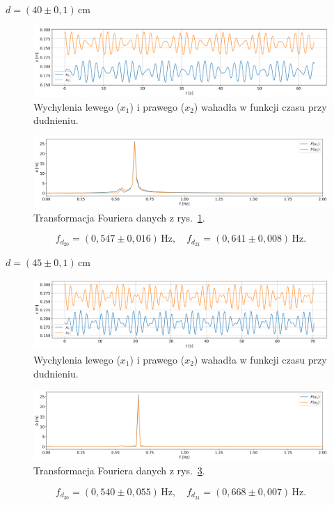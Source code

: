 \documentclass[12pt]{article}
\begin{document}
\(d = (40 \pm 0{,}1)\,\mathrm{cm}\)
\begin{figure}[H]
	\centering
	\includegraphics[width=\linewidth]{beats_2}
	\caption{Wychylenia lewego (\(x_1\)) i prawego (\(x_2\)) wahadła w funkcji czasu przy dudnieniu.}
	\label{fig:beats_1}
\end{figure}
\begin{figure}[H]
	\centering
	\includegraphics[width=\linewidth]{counterphase_2_fft}
	\caption{Transformacja Fouriera danych z rys.~\ref{fig:beats_1}.}
	\label{fig:coutner_phase_1_fft}
\end{figure}
\[
	f_{d_{20}} = (0{,}547 \pm 0{,}016)\,\mathrm{Hz}, \quad
	f_{d_{21}} = (0{,}641 \pm 0{,}008)\,\mathrm{Hz}.
\]

\(d = (45 \pm 0{,}1)\,\mathrm{cm}\)
\begin{figure}[H]
	\centering
	\includegraphics[width=\linewidth]{beats_3}
	\caption{Wychylenia lewego (\(x_1\)) i prawego (\(x_2\)) wahadła w funkcji czasu przy dudnieniu.}
	\label{fig:beats_2}
\end{figure}
\begin{figure}[H]
	\centering
	\includegraphics[width=\linewidth]{counterphase_3_fft}
	\caption{Transformacja Fouriera danych z rys.~\ref{fig:beats_2}.}
	\label{fig:coutner_phase_2_fft}
\end{figure}
\[
	f_{d_{30}} = (0{,}540 \pm 0{,}055)\,\mathrm{Hz}, \quad
	f_{d_{31}} = (0{,}668 \pm 0{,}007)\,\mathrm{Hz}.
\]
\end{document}
